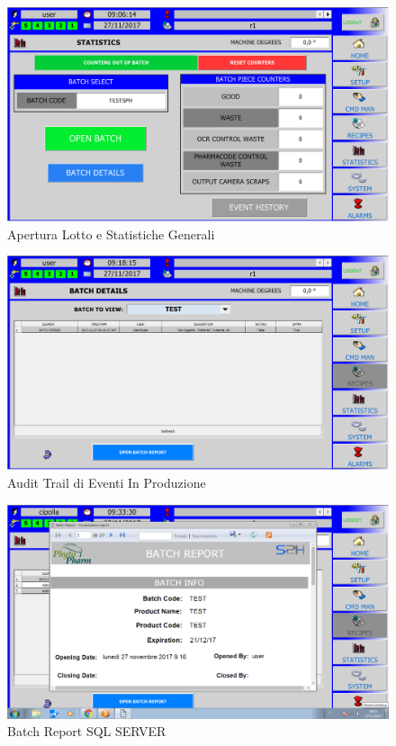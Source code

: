 \documentclass[12pt, a4paper, oneside]{book}
\begin{document}
\begin{figure}[H]
	\centering
	\includegraphics[width=13cm]{Immagini/HMI11}
	\caption{Apertura Lotto e Statistiche Generali}
	\label{HMI11}
\end{figure}

\begin{figure}[H]
	\centering
	\includegraphics[width=13cm]{Immagini/HMI14}
	\caption{Audit Trail di Eventi In Produzione}
	\label{HMI14}
\end{figure}

\begin{figure}[H]
	\centering
	\includegraphics[width=13cm]{Immagini/HMI12}
	\caption{Batch Report SQL SERVER}
	\label{HMI12}
\end{figure}
\end{document}
